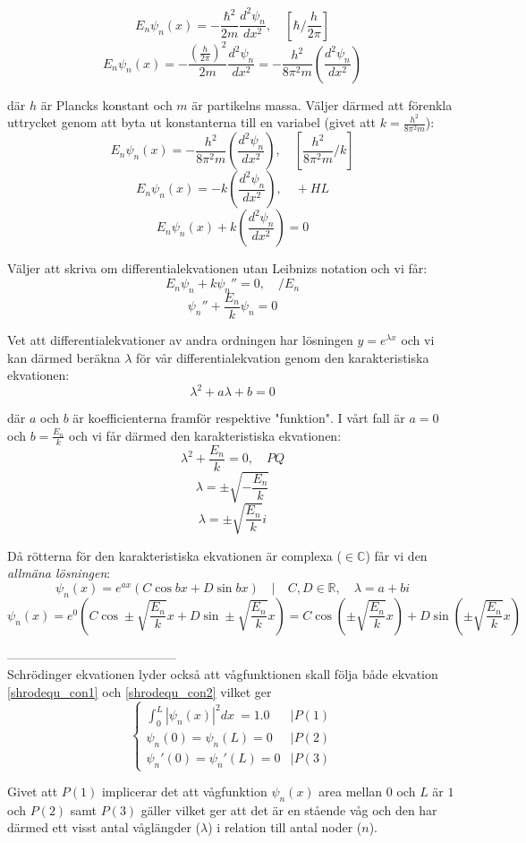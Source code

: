 \documentclass{article}
\newcommand{\shrodequ}{E_n \psi_n(x) = - \frac{\hbar^2}{2m} \frac{d^2 \psi_n}{dx^2}}
\newcommand{\shrodprob}{|\psi_n(x)|^2}
\begin{document}
$$
	\shrodequ, \quad \left[\hbar / \frac{h}{2\pi}\right]
$$
$$
	E_n\psi_n(x) = - \frac{\left(\frac{h}{2\pi}\right)^2}{2m} \frac{d^2 \psi_n}{dx^2} = - \frac{h^2}{8 \pi^2 m} \left(\frac{d^2 \psi_n}{dx^2}\right)
$$

där $h$ är Plancks konstant och $m$ är partikelns massa. Väljer därmed att förenkla uttrycket genom att byta ut konstanterna till en variabel (givet att $k = \frac{h^2}{8 \pi ^2 m}$):
$$
	E_n\psi_n(x) = - \frac{h^2}{8 \pi ^2 m} \left(\frac{d^2 \psi_n}{dx^2}\right), \quad \left[\frac{h^2}{8 \pi ^2 m}/k\right]
$$
$$
	E_n\psi_n(x) = -k\left(\frac{d^2 \psi_n}{dx^2}\right), \quad + HL
$$
$$
	E_n\psi_n(x) + k\left(\frac{d^2 \psi_n}{dx^2}\right) = 0
$$

Väljer att skriva om differentialekvationen utan Leibnizs notation och vi får:
$$
	E_n\psi_n + k \psi_n'' = 0, \quad /E_n 
$$
$$
	\psi_n'' + \frac{E_n}{k}\psi_n = 0 
$$

Vet att differentialekvationer av andra ordningen har lösningen $y=e^{\lambda x}$ och vi kan därmed beräkna $\lambda$ för vår differentialekvation genom den karakteristiska ekvationen:
$$
	\lambda^2 + a\lambda + b = 0
$$

där $a$ och $b$ är koefficienterna framför respektive "funktion". I vårt fall är $a=0$ och $b = \frac{E_n}{k}$ och vi får därmed den karakteristiska ekvationen:
$$
	\lambda^2 + \frac{E_n}{k} = 0, \quad PQ	
$$
$$
	\lambda = \pm \sqrt{-\frac{E_n}{k}}
$$
$$
	\lambda = \pm \sqrt{\frac{E_n}{k}}i
$$

Då rötterna för den karakteristiska ekvationen är complexa ($\in \mathbb{C}$) får vi den \emph{allmäna lösningen}:
$$
	\psi_n(x) = e^{ax}\left(C \cos bx + D \sin bx\right) \quad | \quad C,D \in \mathbb{R}, \quad \lambda = a + bi
$$
$$
	\psi_n(x) = e^{0}\left( C \cos \pm\sqrt{\frac{E_n}{k}}x + D \sin \pm\sqrt{\frac{E_n}{k}}x \right) = C \cos \left(\pm\sqrt{\frac{E_n}{k}}x\right) + D \sin \left(\pm\sqrt{\frac{E_n}{k}}x\right)
$$

----------------------------------------- \\
Schrödinger ekvationen lyder också att vågfunktionen skall följa både ekvation \ref{shrodequ_con1} och \ref{shrodequ_con2} vilket ger 
$$
	\begin{cases}
		\int_0^L \shrodprob dx\ = 1.0 & | P(1) \\
		\psi_n(0) = \psi_n(L) = 0 & | P(2) \\
		\psi_n'(0) = \psi_n'(L) = 0 & | P(3) 
	\end{cases}
$$

Givet att $P(1)$ implicerar det att vågfunktion $\psi_n(x)$ area mellan $0$ och $L$ är $1$ och $P(2)$ samt $P(3)$ gäller vilket ger att det är en stående våg och den har därmed ett visst antal våglängder ($\lambda$) i relation till antal noder ($n$). 
\end{document}
